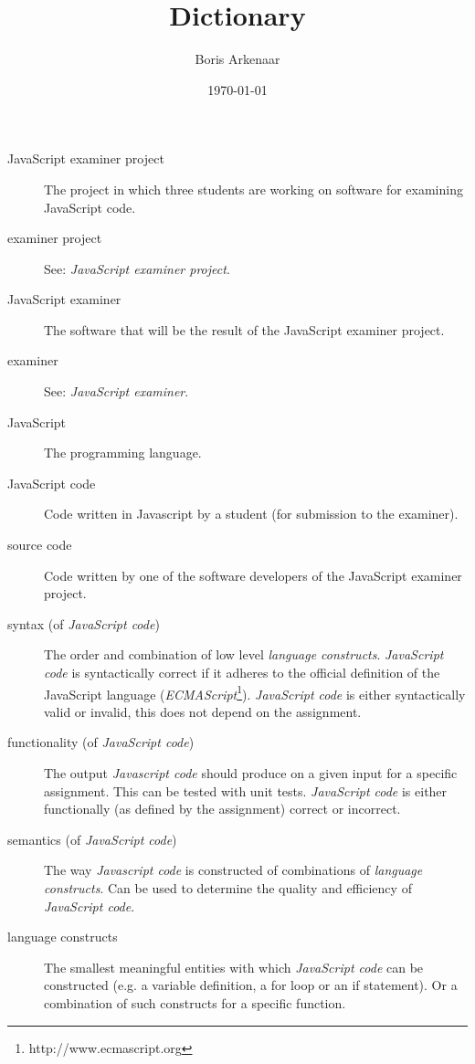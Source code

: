 \documentclass{article}
\begin{document}
\title{Dictionary}
\author{Boris Arkenaar}
\date{\today}
\maketitle

\begin{description}
  \item[JavaScript examiner project] The project in which three students are
    working on software for examining JavaScript code.
  \item[examiner project] See: {\em JavaScript examiner project}.
  \item[JavaScript examiner] The software that will be the result of the
    JavaScript examiner project.
  \item[examiner] See: {\em JavaScript examiner}.
  \item[JavaScript] The programming language.
  \item[JavaScript code] Code written in Javascript by a student (for
    submission to the examiner).
  \item[source code] Code written by one of the software developers of the
    JavaScript examiner project.
  \item[syntax (of {\em JavaScript code})] The order and combination of low
    level {\em language constructs}. {\em JavaScript code} is syntactically
    correct if it adheres to the official definition of the JavaScript language
    ({\em ECMAScript}\footnote{http://www.ecmascript.org}). {\em JavaScript
    code} is either syntactically valid or invalid, this does not depend on the
    assignment.
  \item[functionality (of {\em JavaScript code})] The output {\em Javascript
    code} should produce on a given input for a specific assignment. This can
    be tested with unit tests. {\em JavaScript code} is either functionally (as
    defined by the assignment) correct or incorrect.
  \item[semantics (of {\em JavaScript code})] The way {\em Javascript code} is
    constructed of combinations of {\em language constructs}. Can be used to
    determine the quality and efficiency of {\em JavaScript code}.
  \item[language constructs] The smallest meaningful entities with which {\em
    JavaScript code} can be constructed (e.g. a variable definition, a for loop
    or an if statement). Or a combination of such constructs for a specific
    function.
\end{description}
\end{document}
